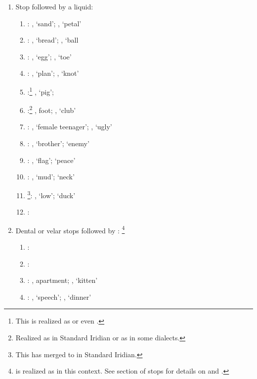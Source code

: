 \begin{enumerate}
	\item Stop followed by a liquid:
		\begin{enumerate}
			\item {}:  , `sand';  , `petal'
			\item {}:  , `bread';  , `ball
			\item {}:  , `egg';  , `toe'
			\item {}:  , `plan'; ,  `knot'
			\item {}:\footnote{This is realized as  or even \bt{\llb}.}  , `pig';  
			\item {}:\footnote{Realized as  in Standard Iridian or as  in some dialects.}  , foot;  , `club'
			\item {}:  , `female teenager';  , `ugly'
			\item {}:  , `brother';   `enemy'
			\item {}:  , `flag';   `peace'
			\item {}:  , `mud';   `neck'
			\item {}\footnote{This has merged to  in Standard Iridian.}:  , `low';   `duck'
			\item {}:  
		\end{enumerate}
	\item Dental or velar stops followed by : \footnote{ is realized as  in this context. See section of stops for details on  and .}
		\begin{enumerate}
			\item {}:
			\item {}:
			\item {}:  , apartment;  , `kitten'
			\item {}:  , `speech';  , `dinner'

\end{enumerate}
\end{enumerate}
